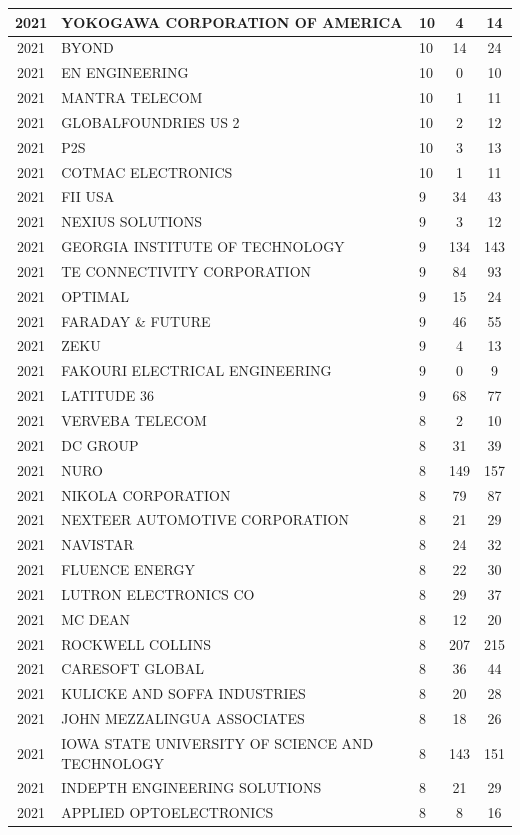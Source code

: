 \documentclass{article}%
\begin{document}
\begin{longtable}{c|p{20em}|p{5em}|c|c}
\hline%
2021&YOKOGAWA CORPORATION OF AMERICA&10&4&14\\%
\hline%
2021&BYOND&10&14&24\\%
\hline%
2021&EN ENGINEERING&10&0&10\\%
\hline%
2021&MANTRA TELECOM&10&1&11\\%
\hline%
2021&GLOBALFOUNDRIES US 2&10&2&12\\%
\hline%
2021&P2S&10&3&13\\%
\hline%
2021&COTMAC ELECTRONICS&10&1&11\\%
\hline%
2021&FII USA&9&34&43\\%
\hline%
2021&NEXIUS SOLUTIONS&9&3&12\\%
\hline%
2021&GEORGIA INSTITUTE OF TECHNOLOGY&9&134&143\\%
\hline%
2021&TE CONNECTIVITY CORPORATION&9&84&93\\%
\hline%
2021&OPTIMAL&9&15&24\\%
\hline%
2021&FARADAY \& FUTURE&9&46&55\\%
\hline%
2021&ZEKU&9&4&13\\%
\hline%
2021&FAKOURI ELECTRICAL ENGINEERING&9&0&9\\%
\hline%
2021&LATITUDE 36&9&68&77\\%
\hline%
2021&VERVEBA TELECOM&8&2&10\\%
\hline%
2021&DC GROUP&8&31&39\\%
\hline%
2021&NURO&8&149&157\\%
\hline%
2021&NIKOLA CORPORATION&8&79&87\\%
\hline%
2021&NEXTEER AUTOMOTIVE CORPORATION&8&21&29\\%
\hline%
2021&NAVISTAR&8&24&32\\%
\hline%
2021&FLUENCE ENERGY&8&22&30\\%
\hline%
2021&LUTRON ELECTRONICS CO&8&29&37\\%
\hline%
2021&MC DEAN&8&12&20\\%
\hline%
2021&ROCKWELL COLLINS&8&207&215\\%
\hline%
2021&CARESOFT GLOBAL&8&36&44\\%
\hline%
2021&KULICKE AND SOFFA INDUSTRIES&8&20&28\\%
\hline%
2021&JOHN MEZZALINGUA ASSOCIATES&8&18&26\\%
\hline%
2021&IOWA STATE UNIVERSITY OF SCIENCE AND TECHNOLOGY&8&143&151\\%
\hline%
2021&INDEPTH ENGINEERING SOLUTIONS&8&21&29\\%
\hline%
2021&APPLIED OPTOELECTRONICS&8&8&16\\%

\end{longtable}
\end{document}
